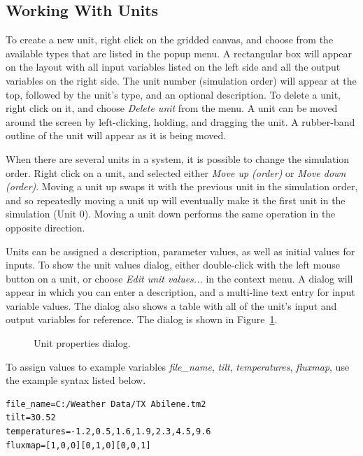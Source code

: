 \documentclass{article}
\begin{document}
\subsection{Working With Units}

To create a new unit, right click on the gridded canvas, and choose from the available types that are listed in the popup menu.  A rectangular box will appear on the layout with all input variables listed on the left side and all the output variables on the right side.  The unit number (simulation order) will appear at the top, followed by the unit's type, and an optional description.  To delete a unit, right click on it, and choose \emph{Delete unit} from the menu.  A unit can be moved around the screen by left-clicking, holding, and dragging the unit.  A rubber-band outline of the unit will appear as it is being moved.


When there are several units in a system, it is possible to change the simulation order.  Right click on a unit, and selected either \emph{Move up (order)} or \emph{Move down (order)}.  Moving a unit up swaps it with the previous unit in the simulation order, and so repeatedly moving a unit up will eventually make it the first unit in the simulation (Unit 0).  Moving a unit down performs the same operation in the opposite direction.

Units can be assigned a description, parameter values, as well as initial values for inputs.  To show the unit values dialog, either double-click with the left mouse button on a unit, or choose \emph{Edit unit values...} in the context menu.  A dialog will appear in which you can enter a description, and a multi-line text entry for input variable values.  The dialog also shows a table with all of the unit's input and output variables for reference.  The dialog is shown in Figure~\ref{fig_editunit}.

\begin{figure}[hp]
\begin{center}\end{center}
\caption{Unit properties dialog.}
\label{fig_editunit}
\end{figure}

To assign values to example variables \emph{file\_name}, \emph{tilt}, \emph{temperatures}, \emph{fluxmap}, use the example syntax listed below.

\begin{verbatim}
file_name=C:/Weather Data/TX Abilene.tm2
tilt=30.52
temperatures=-1.2,0.5,1.6,1.9,2.3,4.5,9.6
fluxmap=[1,0,0][0,1,0][0,0,1]
\end{verbatim}
\end{document}
